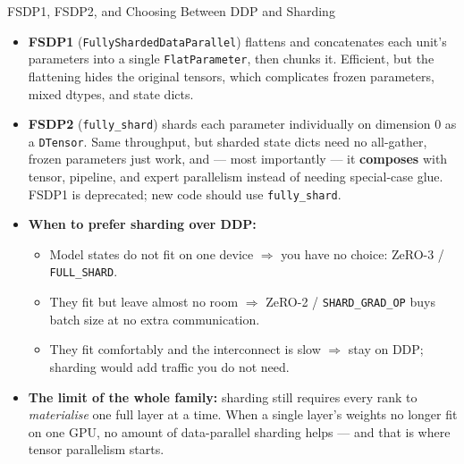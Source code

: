 \begin{frame}[allowframebreaks]{FSDP1, FSDP2, and Choosing Between DDP and Sharding}
  \begin{itemize}\itemsep0.35em
    \item[\textcolor{red}{$\blacktriangleright$}] \textbf{FSDP1} (\texttt{FullyShardedDataParallel}) flattens and concatenates each unit's parameters into a single \texttt{FlatParameter}, then chunks it. Efficient, but the flattening hides the original tensors, which complicates frozen parameters, mixed dtypes, and state dicts.
    \item[\textcolor{red}{$\blacktriangleright$}] \textbf{FSDP2} (\texttt{fully\_shard}) shards each parameter individually on dimension 0 as a \texttt{DTensor}. Same throughput, but sharded state dicts need no all-gather, frozen parameters just work, and --- most importantly --- it \textbf{composes} with tensor, pipeline, and expert parallelism instead of needing special-case glue. FSDP1 is deprecated; new code should use \texttt{fully\_shard}.
    \item[\textcolor{red}{$\blacktriangleright$}] \textbf{When to prefer sharding over DDP:}
      \begin{itemize}\itemsep0.2em\footnotesize
        \item Model states do not fit on one device $\Rightarrow$ you have no choice: ZeRO-3 / \texttt{FULL\_SHARD}.
        \item They fit but leave almost no room $\Rightarrow$ ZeRO-2 / \texttt{SHARD\_GRAD\_OP} buys batch size at no extra communication.
        \item They fit comfortably and the interconnect is slow $\Rightarrow$ stay on DDP; sharding would add traffic you do not need.
      \end{itemize}
    \item[\textcolor{red}{$\blacktriangleright$}] \textbf{The limit of the whole family:} sharding still requires every rank to \emph{materialise} one full layer at a time. When a single layer's weights no longer fit on one GPU, no amount of data-parallel sharding helps --- and that is where tensor parallelism starts.
  \end{itemize}
\end{frame}
